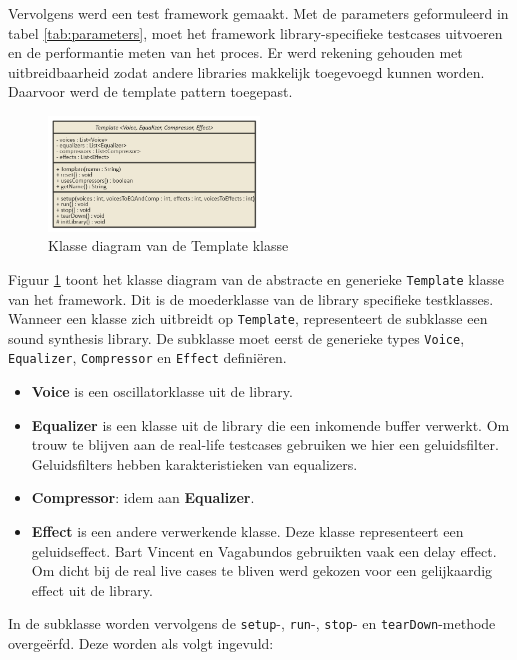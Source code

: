 Vervolgens werd een test framework gemaakt. Met de parameters geformuleerd in tabel \ref{tab:parameters}, moet het framework library-specifieke testcases uitvoeren en de performantie meten van het proces. Er werd rekening gehouden met uitbreidbaarheid zodat andere libraries makkelijk toegevoegd kunnen worden. Daarvoor werd de template pattern toegepast.

\begin{figure}
  \centering
    \includegraphics[width=0.5\textwidth]{imgs/nomnoml.png}
  \caption{Klasse diagram van de Template klasse}
  \label{fig:template}
\end{figure}

Figuur \ref{fig:template} toont het klasse diagram van de abstracte en generieke \verb+Template+ klasse van het framework. Dit is de moederklasse van de library specifieke testklasses. Wanneer een klasse zich uitbreidt op \verb+Template+, representeert de subklasse een sound synthesis library. De subklasse moet eerst de generieke types \verb+Voice+, \verb+Equalizer+, \verb+Compressor+ en \verb+Effect+ definiëren.

\begin{itemize}
	\item \textbf{Voice} is een oscillatorklasse uit de library.
	\item \textbf{Equalizer} is een klasse uit de library die een inkomende buffer verwerkt. Om trouw te blijven aan de real-life testcases gebruiken we hier een geluidsfilter. Geluidsfilters hebben karakteristieken van equalizers.
	\item \textbf{Compressor}: idem aan \textbf{Equalizer}.
	\item \textbf{Effect} is een andere verwerkende klasse. Deze klasse representeert een geluidseffect. Bart Vincent en Vagabundos gebruikten vaak een delay effect. \autocite{bartvincent} \autocite{vagabundos} Om dicht bij de real live cases te bliven werd gekozen voor een gelijkaardig effect uit de library.
\end{itemize}

 In de subklasse worden vervolgens de \verb+setup+-, \verb+run+-, \verb+stop+- en \verb+tearDown+-methode overgeërfd. Deze worden als volgt ingevuld:

